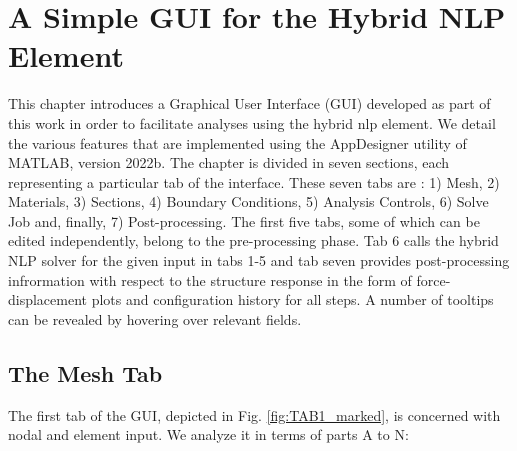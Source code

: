 \chapter{A Simple GUI for the Hybrid NLP Element}

This chapter introduces a Graphical User Interface (GUI) developed as part of 
this work in order to 
facilitate analyses using the hybrid \acrshort{nlp} element. We detail the 
various features that are implemented using the AppDesigner utility of MATLAB, 
version 2022b. The chapter is divided in seven sections, each representing a 
particular tab of the interface. These seven tabs are : 1) Mesh, 2) Materials, 
3) Sections, 4) Boundary Conditions, 5) Analysis Controls, 6) Solve Job and, 
finally, 7) Post-processing. The first five tabs, some of which can be edited 
independently, belong to the pre-processing phase. Tab 6 calls the hybrid NLP 
solver for the given input in tabs 1-5 and tab seven provides post-processing 
infrormation with respect to the structure response in the form of 
force-displacement plots and  configuration history for all steps. A number of 
tooltips can be revealed by hovering over relevant fields.

\section{The Mesh Tab}

The first tab of the GUI, depicted in Fig. \ref{fig:TAB1_marked}, is concerned 
with nodal and element input. We analyze it in terms of parts A to N:

